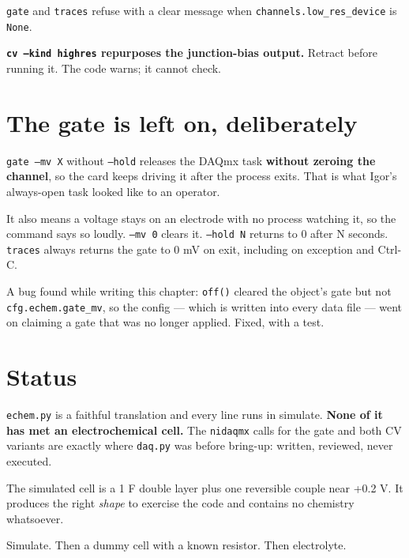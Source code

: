 \texttt{gate} and \texttt{traces} refuse with a clear message when \texttt{channels.\discretionary{}{}{}low\_\discretionary{}{}{}res\_\discretionary{}{}{}device} is \texttt{None}.

\begin{warnbox}
\textbf{\texttt{cv --kind highres} repurposes the junction-bias output.} Retract before running it. The code warns; it cannot check.
\end{warnbox}

\section{The gate is left on, deliberately}

\texttt{gate --mv X} without \texttt{--hold} releases the DAQmx task \textbf{without zeroing the channel}, so the card keeps driving it after the process exits. That is what Igor's always-open task looked like to an operator.

It also means a voltage stays on an electrode with no process watching it, so the command says so loudly. \texttt{--mv 0} clears it. \texttt{--hold N} returns to 0 after N seconds. \texttt{traces} always returns the gate to 0 mV on exit, including on exception and Ctrl-C.

A bug found while writing this chapter: \texttt{off()} cleared the object's gate but not \texttt{cfg.\discretionary{}{}{}echem.\discretionary{}{}{}gate\_\discretionary{}{}{}mv}, so the config --- which is written into every data file --- went on claiming a gate that was no longer applied. Fixed, with a test.

\section{Status}

\texttt{echem.\discretionary{}{}{}py} is a faithful translation and every line runs in simulate. \textbf{None of it has met an electrochemical cell.} The \texttt{nidaqmx} calls for the gate and both CV variants are exactly where \texttt{daq.\discretionary{}{}{}py} was before bring-up: written, reviewed, never executed.

The simulated cell is a 1 \textmu{}F double layer plus one reversible couple near +0.2 V. It produces the right \emph{shape} to exercise the code and contains no chemistry whatsoever.

Simulate. Then a dummy cell with a known resistor. Then electrolyte.

\setcounter{chapter}{15}
